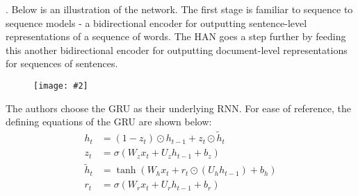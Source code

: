\documentclass[11pt]{article}
\newcommand\myfig[2][0.3\textwidth]{\begin{figure}[h!]\centering\texttt{[image: \#2]}\end{figure}}
\newcommand\myspace[1][]{\vspace{#1\bigskipamount}}
\newcommand\p{\Needspace{10\baselineskip} \noindent}
\begin{document}
\myspace
\p {}. Below is an illustration of the network. The first stage is familiar to sequence to sequence models - a bidirectional encoder for outputting sentence-level representations of a sequence of words. The HAN goes a step further by feeding this another bidirectional encoder for outputting document-level representations for sequences of sentences. 

\myfig[0.4\textwidth]{HAN.png}

The authors choose the GRU as their underlying RNN. For ease of reference, the defining equations of the GRU are shown below:
\begin{align}
h_t &= (1 - z_t) \odot h_{t - 1} + z_t \odot \tilde h_t \\
z_t &= \sigma \left( W_z x_t + U_z h_{t - 1} + b_z \right) \\
\tilde h_t &= \tanh \left( W_h x_t + r_t \odot (U_h h_{t - 1}) + b_h \right) \\
r_t &= \sigma \left( W_r x_t + U_r h_{t - 1} + b_r \right)
\end{align}
\end{document}
